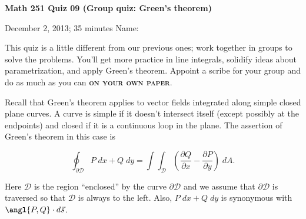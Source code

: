 \documentclass[12pt]{exam}
\begin{document}
\noindent
\textbf{{\large Math 251 \hfill Quiz 09 (Group quiz: Green's theorem)}}

\noindent
December 2, 2013; 35 minutes \hfill Name: \underline{\hspace{3in}} 

\noindent

\noindent
This quiz is a little different from our previous ones; work together in
groups to solve the problems. You'll get more practice in line
integrals, solidify ideas about parametrization, and apply Green's
theorem. Appoint a scribe for your group and do as much as you can
\textbf{\textsc{on your own paper}}.

Recall that Green's theorem applies to vector fields integrated along
simple closed plane curves. A curve is simple if it doesn't intersect
itself (except possibly at the endpoints) and closed if it is a
continuous loop in the plane. The assertion of Green's theorem in this
case is

\begin{equation} \label{eq:green} 
    \oint_{\mathcal{\partial \mathcal{D}}} P \; dx + Q \; dy = \int \!\!\!\!\!\! \int_{\mathcal{D}} \left( \frac{\partial Q}{\partial x} - \frac{\partial P}{\partial y} \right) \; dA.
\end{equation}

Here $\mathcal{D}$ is the region ``enclosed'' by the curve
$\partial \mathcal{D}$ and we assume that $\partial \mathcal{D}$ is
traversed so that $\mathcal{D}$ is always to the left. Also,
$P \; dx + Q \; dy$ is synonymous with $\angl{P, Q} \cdot d\vec{s}$.
\end{document}
